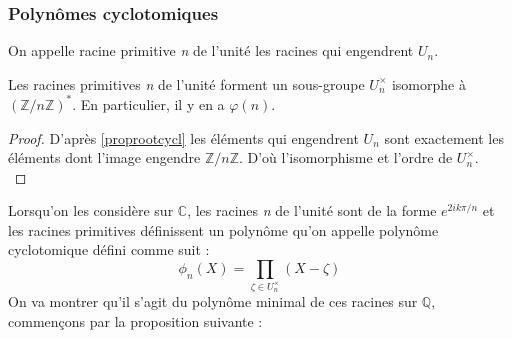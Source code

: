 \documentclass[a4paper]{article} %
\numberwithin{equation}{section}
\newcommand\nroot[1]{\textit{#1}\up{\textit{ième}}}
\newcommand\zmodn[1]{\mathbb{Z}/#1\mathbb{Z}}
\begin{document}
\subsubsection{Polynômes cyclotomiques}

\begin{defn}
On appelle racine primitive \nroot{n} de l'unité les racines qui engendrent $U_n$.
\end{defn}

\begin{prop}
Les racines primitives \nroot{n} de l'unité forment un sous-groupe $U^{\times}_n$ isomorphe à $(\zmodn{n})^*$. En particulier, il y en a $\varphi(n)$.
\end{prop}
\begin{proof}
D'après \ref{proprootcycl} les éléments qui engendrent $U_n$ sont exactement les éléments dont l'image engendre $\zmodn{n}$. D'où l'isomorphisme et l'ordre de $U^{\times}_n$.\\
\end{proof}

Lorsqu'on les considère sur $\mathbb{C}$, les racines \nroot{n} de l'unité sont de la forme $e^{2ik\pi/n}$ et les racines primitives définissent un polynôme qu'on appelle polynôme cyclotomique défini comme suit : 
\[\phi_n(X) = \prod_{\zeta\in U_n^{\times}}{(X - \zeta)}\]
On va montrer qu'il s'agit du polynôme minimal de ces racines sur $\mathbb{Q}$, commençons par la proposition suivante :
\end{document}
